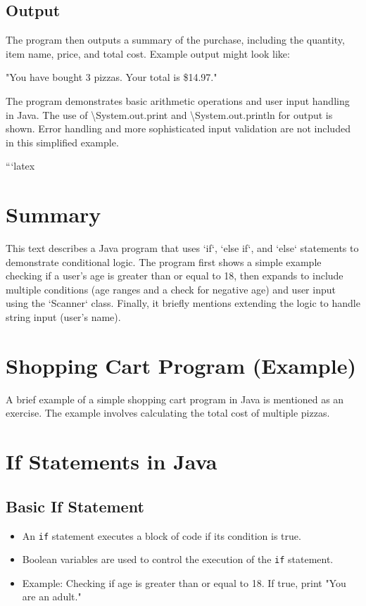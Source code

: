 \documentclass{article}
\begin{document}
\subsection{Output}

The program then outputs a summary of the purchase, including the quantity, item name, price, and total cost.  Example output might look like:

"You have bought 3 pizzas. Your total is \$14.97."


The program demonstrates basic arithmetic operations and user input handling in Java.  The use of \textbackslash{}System.out.print and \textbackslash{}System.out.println for output is shown.  Error handling and more sophisticated input validation are not included in this simplified example.


```latex
\section{Summary}

This text describes a Java program that uses `if`, `else if`, and `else` statements to demonstrate conditional logic.  The program first shows a simple example checking if a user's age is greater than or equal to 18, then expands to include multiple conditions (age ranges and a check for negative age) and user input using the `Scanner` class. Finally, it briefly mentions extending the logic to handle string input (user's name).


\section{Shopping Cart Program (Example)}

A brief example of a simple shopping cart program in Java is mentioned as an exercise.  The example involves calculating the total cost of multiple pizzas.


\section{If Statements in Java}

\subsection{Basic If Statement}

\begin{itemize}
    \item An \texttt{if} statement executes a block of code if its condition is true.
    \item Boolean variables are used to control the execution of the \texttt{if} statement.
    \item Example:  Checking if age is greater than or equal to 18.  If true, print "You are an adult."
\end{itemize}
\end{document}
